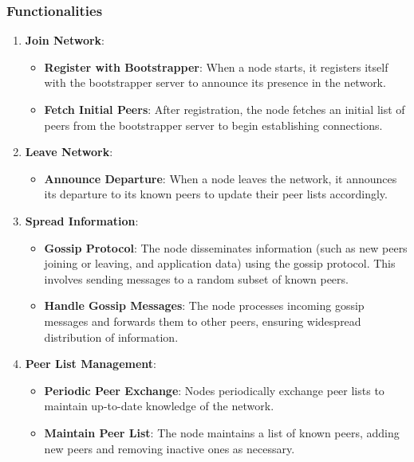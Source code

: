\subsubsection{Functionalities}
\begin{enumerate}
    \item \textbf{Join Network}:
    \begin{itemize}
        \item \textbf{Register with Bootstrapper}: When a node starts, it registers itself with the bootstrapper server to announce its presence in the network.
        \item \textbf{Fetch Initial Peers}: After registration, the node fetches an initial list of peers from the bootstrapper server to begin establishing connections.
    \end{itemize}
    \item \textbf{Leave Network}:
    \begin{itemize}
        \item \textbf{Announce Departure}: When a node leaves the network, it announces its departure to its known peers to update their peer lists accordingly.
    \end{itemize}
    \item \textbf{Spread Information}:
    \begin{itemize}
        \item \textbf{Gossip Protocol}: The node disseminates information (such as new peers joining or leaving, and application data) using the gossip protocol. This involves sending messages to a random subset of known peers.
        \item \textbf{Handle Gossip Messages}: The node processes incoming gossip messages and forwards them to other peers, ensuring widespread distribution of information.
    \end{itemize}
    \item \textbf{Peer List Management}:
    \begin{itemize}
        \item \textbf{Periodic Peer Exchange}: Nodes periodically exchange peer lists to maintain up-to-date knowledge of the network.
        \item \textbf{Maintain Peer List}: The node maintains a list of known peers, adding new peers and removing inactive ones as necessary.
    \end{itemize}
\end{enumerate}

